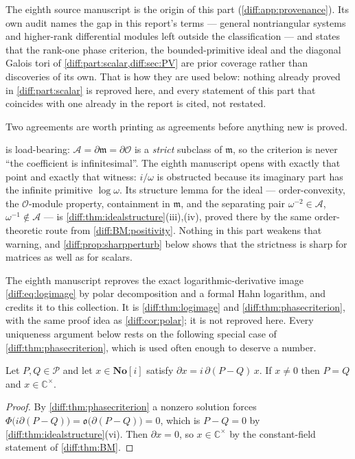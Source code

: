 \documentclass[11pt,letterpaper]{article}
\numberwithin{equation}{section}
\theoremstyle{definition}
\theoremstyle{remark}
\newcommand{\SC}{\mathbf{No}[i]}
\newcommand{\C}{\mathbb C}
\newcommand{\der}{\partial}
\newcommand{\Ofin}{\mathcal O}
\newcommand{\mm}{\mathfrak m}
\newcommand{\Pcl}{\mathcal P}
\newcommand{\Acl}{\mathcal A}
\newcommand{\Obs}{\mathfrak o}
\begin{document}
The eighth source manuscript is the origin of this part
(\cref{diff:app:provenance}). Its own audit names the gap in this report's
terms --- general nontriangular systems and higher-rank differential modules
left outside the classification --- and states that the rank-one phase
criterion, the bounded-primitive ideal and the diagonal Galois tori of
\cref{diff:part:scalar,diff:sec:PV} are prior coverage rather than discoveries
of its own. That is how they are used below: nothing already proved in
\cref{diff:part:scalar} is reproved here, and every statement of this part
that coincides with one already in the report is cited, not restated.

Two agreements are worth printing as agreements before anything new is proved.

\begin{remark}
\label{diff:rem:matagreement}
 is load-bearing: $\Acl=\der\mm=\der\Ofin$ is a
\emph{strict} subclass of $\mm$, so the criterion is never ``the coefficient
is infinitesimal''. The eighth manuscript opens with exactly that point and
exactly that witness: $i/\omega$ is obstructed because its imaginary part has
the infinite primitive $\log\omega$. Its structure lemma for the ideal ---
order-convexity, the $\Ofin$-module property, containment in $\mm$, and the
separating pair $\omega^{-2}\in\Acl$, $\omega^{-1}\notin\Acl$ --- is
\cref{diff:thm:idealstructure}(iii),(iv), proved there by the same
order-theoretic route from \ref{diff:BM:positivity}. Nothing in this part
weakens that warning, and \cref{diff:prop:sharpperturb} below shows that the
strictness is sharp for matrices as well as for scalars.
\end{remark}

\begin{remark}
\label{diff:rem:matrankone}
The eighth manuscript reproves the exact logarithmic-derivative image
\cref{diff:eq:logimage} by polar decomposition and a formal Hahn logarithm,
and credits it to this collection. It is \cref{diff:thm:logimage} and
\cref{diff:thm:phasecriterion}, with the same proof idea as
\cref{diff:cor:polar}; it is not reproved here. Every uniqueness argument
below rests on the following special case of \cref{diff:thm:phasecriterion},
which is used often enough to deserve a number.
\end{remark}

\begin{lemma}
\label{diff:lem:matseparation}
Let $P,Q\in\Pcl$ and let $x\in\SC$ satisfy
$\der x=i\,\der(P-Q)\,x$. If $x\neq0$ then $P=Q$ and $x\in\C^{\times}$.
\end{lemma}
\begin{proof}
By \cref{diff:thm:phasecriterion} a nonzero solution forces
$\Phi\bigl(i\der(P-Q)\bigr)=\Obs\bigl(\der(P-Q)\bigr)=0$, which is $P-Q=0$ by
\cref{diff:thm:idealstructure}(vi). Then $\der x=0$, so $x\in\C^{\times}$ by
the constant-field statement of \cref{diff:thm:BM}.
\end{proof}
\end{document}
